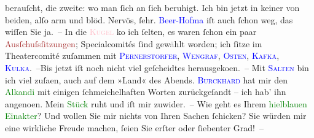                berauſcht, die zweite: wo man ſich an ſich beruhigt. Ich bin jetzt in keiner von
               beiden, alſo arm und blöd. Nervös, ſehr. \textcolor{blue}{Beer-{\pb}Hofma{\geminationn}}{}\ledrightnote{\textcolor{blue}{Richard Beer-Hofmann}} iſt auch ſchon weg, das wiſſen Sie ja. – In die \textcolor{pink}{\textsc{Kugel}}{}\ledrightnote{\textcolor{pink}{Café Kugel}} ko{\geminationm} ich ſelten, es waren ſchon ein paar \textcolor{brown}{Ausſchuſsſitzungen}{};
                  Specialcomités{ }ſind gew\textcolor{gray}{ä}hlt worden; ich ſitze im Theatercomité
               zuſammen mit \textcolor{blue}{\textsc{Pernerstorfer}}{}\ledrightnote{\textcolor{blue}{Engelbert Pernerstorfer}}, \textcolor{blue}{\textsc{Wengraf}}{}\ledrightnote{\textcolor{blue}{Edmund Wengraf}}, \textcolor{blue}{\textsc{Osten}}{}\ledrightnote{\textcolor{blue}{Heinrich Osten}}, \textcolor{blue}{\textsc{Kafka}}{}\ledrightnote{\textcolor{blue}{Eduard Michael Kafka}}, \textcolor{blue}{\textsc{Kulka}}{}\ledrightnote{\textcolor{blue}{Julius Kulka}}. –\hspace*{2.5em}Bis jetzt iſt noch nicht viel geſcheidtes
                  herausgeko{\geminationm}en. – Mit \textcolor{blue}{\textsc{Salten}}{}\ledrightnote{\textcolor{blue}{Felix Salten}} bin ich viel zuſa{\geminationm}en, auch auf dem »Land« des
               Abends. \textcolor{blue}{\textsc{Burckhard}}{}\ledrightnote{\textcolor{blue}{Max Eugen Burckhard}} hat mir den \textcolor{green}{Alkandi}{}\ledrightnote{\textcolor{green}{Alkandi’s Lied}} mit einigen
               ſchmeichelhaften Worten {\pb}zurückgeſandt – ich hab’ ihn
                  angeno{\geminationm}en. Mein \textcolor{green}{Stück}{} ruht und iſt mir zuwider. – Wie geht es Ihrem \textcolor{green}{hi{\geminationm}elblauen Einakter}{}? Und wollen Sie mir nichts von Ihren Sachen ſchicken? Sie
               würden mir eine wirkliche Freude machen, ſeien Sie erſter oder ſiebenter Grad! –
